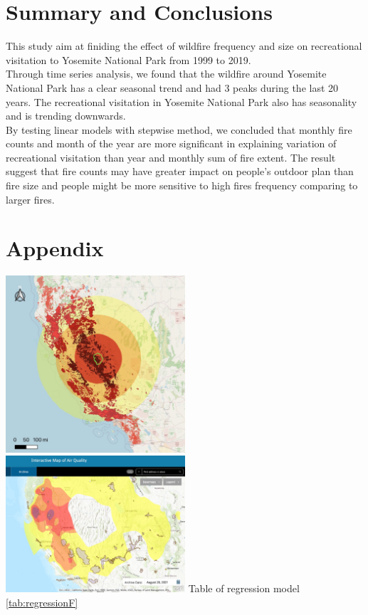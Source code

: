 \documentclass[
  12pt,
]{article}
\begin{document}
\newpage

\hypertarget{summary-and-conclusions}{%
\section{Summary and Conclusions}\label{summary-and-conclusions}}

This study aim at finiding the effect of wildfire frequency and size on recreational visitation to Yosemite National Park from 1999 to 2019.\\
Through time series analysis, we found that the wildfire around Yosemite National Park has a clear seasonal trend and had 3 peaks during the last 20 years. The recreational visitation in Yosemite National Park also has seasonality and is trending downwards.\\
By testing linear models with stepwise method, we concluded that monthly fire counts and month of the year are more significant in explaining variation of recreational visitation than year and monthly sum of fire extent. The result suggest that fire counts may have greater impact on people's outdoor plan than fire size and people might be more sensitive to high fires frequency comparing to larger fires.

\newpage

\hypertarget{appendix}{%
\section{Appendix}\label{appendix}}

\includegraphics[width=0.5\textwidth,height=\textheight]{Output/buffer.JPG}
\includegraphics[width=0.5\textwidth,height=\textheight]{Output/AirQualityMap.JPG}
\newline
Table of regression model
\ref{tab:regressionF}
\end{document}
